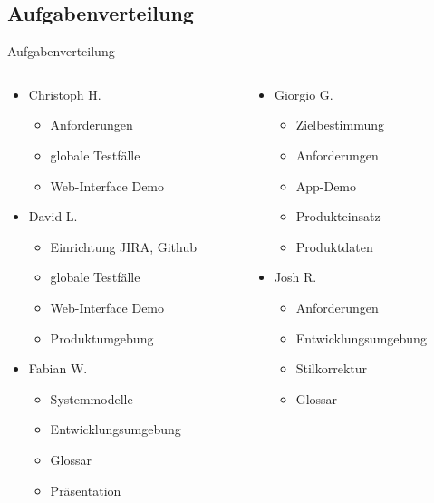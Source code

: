 \documentclass[19pt]{beamer}
\begin{document}
\subsection{Aufgabenverteilung}
\begin{frame}{Aufgabenverteilung}
  \begin{columns}[T]
    \begin{column}{.5\textwidth}
    		\begin{itemize}
    			\item Christoph H.
			\begin{itemize}
				\item Anforderungen
				\item globale Testf\"alle
				\item Web-Interface Demo
			\end{itemize}
		\item David L.
			\begin{itemize}
				\item Einrichtung JIRA, Github				
				\item globale Testf\"alle
				\item Web-Interface Demo
				\item Produktumgebung
			\end{itemize}
		\item Fabian W.
			\begin{itemize}
				\item Systemmodelle
				\item Entwicklungsumgebung
				\item Glossar
				\item Pr\"asentation
			\end{itemize}
    		\end{itemize}
    \end{column}
    \begin{column}{.5\textwidth}
    		\begin{itemize}
		\item Giorgio G.
			\begin{itemize}
				\item Zielbestimmung
				\item Anforderungen
				\item App-Demo
				\item Produkteinsatz
				\item Produktdaten
			\end{itemize}
		\item Josh R.
			\begin{itemize}
				\item Anforderungen
				\item Entwicklungsumgebung
				\item Stilkorrektur
				\item Glossar
			\end{itemize}
	\end{itemize}
    \end{column}
  \end{columns}
\end{frame}
\end{document}
